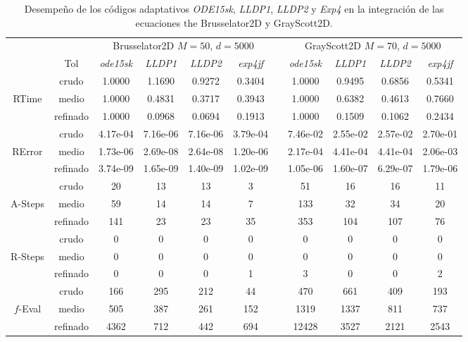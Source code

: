 \begin{table}[htb]
	\caption{Desempeño de los códigos adaptativos \emph{ODE15sk}, \emph{LLDP1}, \emph{LLDP2} y \emph{Exp4} en la integración de las ecuaciones the Brusselator2D y GrayScott2D.}
	\label{tab:bruss2DGrayScott}
	\begin{adjustbox}{width=0.95\columnwidth,center}
		\begin{tabular}{ccccccccccc}
			\hline
			&  & \multicolumn{4}{c}{Brusselator2D $M=50$, $d=5000$} &  & \multicolumn{4}{c}{GrayScott2D $M=70$, $d=5000$} \\
			\cline{3-6}\cline{8-11} & Tol & \emph{ode15sk} & \emph{LLDP1} & \emph{LLDP2} & \emph{exp4jf} &  & \emph{ode15sk} & \emph{LLDP1} & \emph{LLDP2} & \emph{exp4jf} \\
			\hline
			& crudo & 1.0000 & 1.1690 & 0.9272 & 0.3404 &  & 1.0000 & 0.9495 & 0.6856 & 0.5341 \\
			RTime & medio & 1.0000 & 0.4831 & 0.3717 & 0.3943 &  & 1.0000 & 0.6382 & 0.4613 & 0.7660 \\
			& refinado & 1.0000 & 0.0968 & 0.0694 & 0.1913 &  & 1.0000 & 0.1509 & 0.1062 & 0.2434 \\
			\hline
			& crudo & 4.17e-04 & 7.16e-06 & 7.16e-06 & 3.79e-04 &  & 7.46e-02 & 2.55e-02 & 2.57e-02 & 2.70e-01 \\
			RError & medio & 1.73e-06 & 2.69e-08 & 2.64e-08 & 1.20e-06 &  & 2.17e-04 & 4.41e-04 & 4.41e-04 & 2.06e-03 \\
			& refinado & 3.74e-09 & 1.65e-09 & 1.40e-09 & 1.02e-09 &  & 1.05e-06 & 1.60e-07 & 6.29e-07 & 1.79e-06 \\
			\hline
			& crudo & 20 & 13 & 13 & 3 &  & 51 & 16 & 16 & 11 \\
			A-Steps & medio & 59 & 14 & 14 & 7 &  & 133 & 32 & 34 & 20 \\
			& refinado & 141 & 23 & 23 & 35 &  & 353 & 104 & 107 & 76 \\
			\hline
			& crudo & 0 & 0 & 0 & 0 &  & 0 & 0 & 0 & 0 \\
			R-Steps & medio & 0 & 0 & 0 & 0 &  & 0 & 0 & 0 & 0 \\
			& refinado & 0 & 0 & 0 & 1 &  & 3 & 0 & 0 & 2 \\
			\hline
			& crudo & 166 & 295 & 212 & 44 &  & 470 & 661 & 409 & 193 \\
			$f$-Eval & medio & 505 & 387 & 261 & 152 &  & 1319 & 1337 & 811 & 737 \\
			& refinado & 4362 & 712 & 442 & 694 &  & 12428 & 3527 & 2121 & 2543 \\

\end{tabular}
\end{adjustbox}
\end{table}
